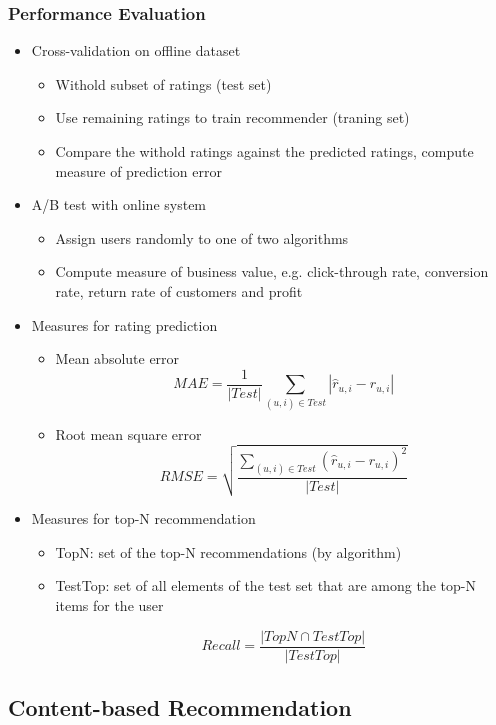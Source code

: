\documentclass[../notes.tex]{subfiles}
\begin{document}
\subsubsection{Performance Evaluation}
\begin{itemize}
  \item Cross-validation on offline dataset
  \begin{itemize}
    \item Withold subset of ratings (test set)
    \item Use remaining ratings to train recommender (traning set)
    \item Compare the withold ratings against the predicted ratings, compute measure of prediction error
  \end{itemize}

  \item A/B test with online system
  \begin{itemize}
    \item Assign users randomly to one of two algorithms
    \item Compute measure of business value, e.g. click-through rate, conversion rate, return rate of customers and profit
  \end{itemize}

  \item Measures for rating prediction
  \begin{itemize}
  \item Mean absolute error
    $$MAE = \frac{1}{|Test|} \sum_{(u, i) \in Test} |\hat r_{u,i} - r_{u, i}|$$
    \item Root mean square error
    $$RMSE = \sqrt{\frac{\sum_{(u, i) \in Test} (\hat r_{u,i} - r_{u, i})^2}{|Test|}}$$
  \end{itemize}

  \item Measures for top-N recommendation
  \begin{itemize}
    \item TopN: set of the top-N recommendations (by algorithm)
    \item TestTop: set of all elements of the test set that are among the top-N items for the user

    $$Recall = \frac{|TopN \cap TestTop|}{|TestTop|}$$
  \end{itemize}
\end{itemize}

\subsection{Content-based Recommendation}
\end{document}
